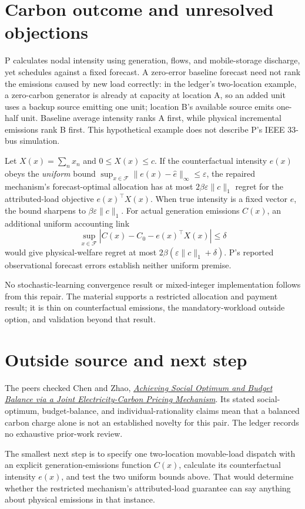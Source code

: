 \documentclass{article}
\begin{document}
\section*{Carbon outcome and unresolved objections}

P calculates nodal intensity using generation, flows, and mobile-storage discharge, yet schedules against a fixed forecast. A zero-error baseline forecast need not rank the emissions caused by new load correctly: in the ledger's two-location example, a zero-carbon generator is already at capacity at location A, so an added unit uses a backup source emitting one unit; location B's available source emits one-half unit. Baseline average intensity ranks A first, while physical incremental emissions rank B first. This hypothetical example does not describe P's IEEE 33-bus simulation. 

Let \(X(x)=\sum_n x_n\) and \(0\leq X(x)\leq c\). If the counterfactual intensity \(e(x)\) obeys the \emph{uniform} bound
\(\sup_{x\in\mathcal F}\|e(x)-\hat e\|_\infty\leq\varepsilon\), the repaired mechanism's forecast-optimal allocation has at most \(2\beta\varepsilon\|c\|_1\) regret for the attributed-load objective \(e(x)^\top X(x)\). When true intensity is a fixed vector \(e\), the bound sharpens to \(\beta\varepsilon\|c\|_1\). For actual generation emissions \(C(x)\), an additional uniform accounting link
\[
\sup_{x\in\mathcal F}
\left|C(x)-C_0-e(x)^\top X(x)\right|\leq\delta
\]
would give physical-welfare regret at most
\(2\beta(\varepsilon\|c\|_1+\delta)\). P's reported observational forecast errors establish neither uniform premise. 

No stochastic-learning convergence result or mixed-integer implementation follows from this repair. The material supports a restricted allocation and payment result; it is thin on counterfactual emissions, the mandatory-workload outside option, and validation beyond that result. 

\section*{Outside source and next step}

The peers checked Chen and Zhao, \href{https://arxiv.org/abs/2308.08195}{\emph{Achieving Social Optimum and Budget Balance via a Joint Electricity-Carbon Pricing Mechanism}}. Its stated social-optimum, budget-balance, and individual-rationality claims mean that a balanced carbon charge alone is not an established novelty for this pair. The ledger records no exhaustive prior-work review. 

The smallest next step is to specify one two-location movable-load dispatch with an explicit generation-emissions function \(C(x)\), calculate its counterfactual intensity \(e(x)\), and test the two uniform bounds above. That would determine whether the restricted mechanism's attributed-load guarantee can say anything about physical emissions in that instance. 
\end{document}

